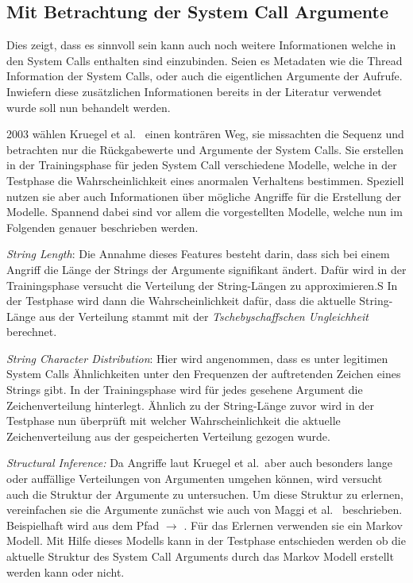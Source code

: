     \subsection{Mit Betrachtung der System Call Argumente}\label{sec:related_sys_arg}

        Dies zeigt, dass es sinnvoll sein kann auch noch weitere Informationen welche in den System Calls enthalten sind einzubinden.
        Seien es Metadaten wie die Thread Information der System Calls, oder auch die eigentlichen Argumente der Aufrufe.
        Inwiefern diese zusätzlichen Informationen bereits in der Literatur verwendet wurde soll nun behandelt werden.

        2003 wählen Kruegel et al.~\cite{ARGUMENTS} einen konträren Weg, sie missachten die Sequenz und betrachten nur die Rückgabewerte und Argumente der System Calls.
        Sie erstellen in der Trainingsphase für jeden System Call verschiedene Modelle, welche in der Testphase die Wahrscheinlichkeit eines anormalen Verhaltens bestimmen.
        Speziell nutzen sie aber auch Informationen über mögliche Angriffe für die Erstellung der Modelle.
        Spannend dabei sind vor allem die vorgestellten Modelle, welche nun im Folgenden genauer beschrieben werden.

        \textit{String Length}: Die Annahme dieses Features besteht darin, dass sich bei einem Angriff die Länge der Strings der Argumente signifikant ändert.
        Dafür wird in der Trainingsphase versucht die Verteilung der String-Längen zu approximieren.S
        In der Testphase wird dann die Wahrscheinlichkeit dafür, dass die aktuelle String-Länge aus der Verteilung stammt mit der \textit{Tschebyschaffschen Ungleichheit} berechnet.
        
        \textit{String Character Distribution}: Hier wird angenommen, dass es unter legitimen System Calls Ähnlichkeiten unter den Frequenzen der auftretenden Zeichen eines Strings gibt.
        In der Trainingsphase wird für jedes gesehene Argument die Zeichenverteilung hinterlegt.
        Ähnlich zu der String-Länge zuvor wird in der Testphase nun überprüft mit welcher Wahrscheinlichkeit die aktuelle Zeichenverteilung aus der gespeicherten Verteilung gezogen wurde.

        \textit{Structural Inference:} Da Angriffe laut Kruegel et al.\ aber auch besonders lange oder auffällige Verteilungen von Argumenten umgehen können, wird versucht auch die Struktur der Argumente zu untersuchen.
        Um diese Struktur zu erlernen, vereinfachen sie die Argumente zunächst wie auch von Maggi et al.~\cite{ARGUMENTS2} beschrieben.
        Beispielhaft wird aus dem Pfad  $\longrightarrow$ .
        Für das Erlernen verwenden sie ein Markov Modell.
        Mit Hilfe dieses Modells kann in der Testphase entschieden werden ob die aktuelle Struktur des System Call Arguments durch das Markov Modell erstellt werden kann oder nicht.

